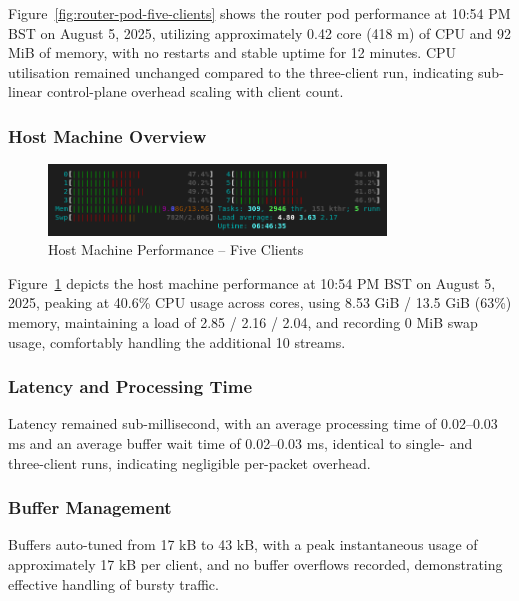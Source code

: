 Figure~\ref{fig:router-pod-five-clients} shows the router pod performance at 10:54 PM BST on August 5, 2025, utilizing approximately 0.42 core (418 m) of CPU and 92 MiB of memory, with no restarts and stable uptime for 12 minutes. CPU utilisation remained unchanged compared to the three-client run, indicating sub-linear control-plane overhead scaling with client count.

\subsubsection{Host Machine Overview}
\begin{figure}[h!]
\centering
\includegraphics[width=0.8\textwidth]{Evaluation/five-clients-machine-stats.png}
\caption{Host Machine Performance – Five Clients}
\label{fig:host-machine-five-clients}
\end{figure}

Figure~\ref{fig:host-machine-five-clients} depicts the host machine performance at 10:54 PM BST on August 5, 2025, peaking at 40.6\% CPU usage across cores, using 8.53 GiB / 13.5 GiB (63\%) memory, maintaining a load of 2.85 / 2.16 / 2.04, and recording 0 MiB swap usage, comfortably handling the additional 10 streams.

\subsubsection{Latency and Processing Time}
Latency remained sub-millisecond, with an average processing time of 0.02–0.03 ms and an average buffer wait time of 0.02–0.03 ms, identical to single- and three-client runs, indicating negligible per-packet overhead.

\subsubsection{Buffer Management}
Buffers auto-tuned from 17 kB to 43 kB, with a peak instantaneous usage of approximately 17 kB per client, and no buffer overflows recorded, demonstrating effective handling of bursty traffic.


